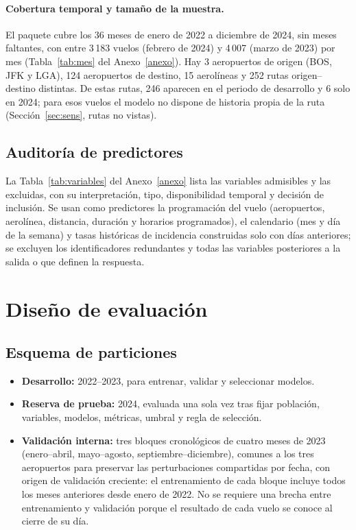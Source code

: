 \documentclass[11pt,a4paper]{article}
\begin{document}
\paragraph{Cobertura temporal y tamaño de la muestra.}
El paquete cubre los 36 meses de enero de 2022 a diciembre de 2024, sin meses faltantes, con entre 3\,183 vuelos (febrero de 2024) y 4\,007 (marzo de 2023) por mes (Tabla~\ref{tab:mes} del Anexo~\ref{anexo}). Hay 3 aeropuertos de origen (BOS, JFK y LGA), 124 aeropuertos de destino, 15 aerolíneas y 252 rutas origen--destino distintas. De estas rutas, 246 aparecen en el periodo de desarrollo y 6 solo en 2024; para esos vuelos el modelo no dispone de historia propia de la ruta (Sección~\ref{sec:sens}, rutas no vistas).
 
 
 
 
\subsection{Auditoría de predictores}
La Tabla~\ref{tab:variables} del Anexo~\ref{anexo} lista las variables admisibles y las excluidas, con su interpretación, tipo, disponibilidad temporal y decisión de inclusión. Se usan como predictores la programación del vuelo (aeropuertos, aerolínea, distancia, duración y horarios programados), el calendario (mes y día de la semana) y tasas históricas de incidencia construidas solo con días anteriores; se excluyen los identificadores redundantes y todas las variables posteriores a la salida o que definen la respuesta.
\FloatBarrier
 
\section{Diseño de evaluación}
 
\subsection{Esquema de particiones}
\begin{itemize}[leftmargin=*]
  \item \textbf{Desarrollo:} 2022--2023, para entrenar, validar y seleccionar modelos.
  \item \textbf{Reserva de prueba:} 2024, evaluada una sola vez tras fijar población, variables, modelos, métricas, umbral y regla de selección.
  \item \textbf{Validación interna:} tres bloques cronológicos de cuatro meses de 2023 (enero--abril, mayo--agosto, septiembre--diciembre), comunes a los tres aeropuertos para preservar las perturbaciones compartidas por fecha, con origen de validación creciente: el entrenamiento de cada bloque incluye todos los meses anteriores desde enero de 2022. No se requiere una brecha entre entrenamiento y validación porque el resultado de cada vuelo se conoce al cierre de su día.
\end{itemize}
 
\end{document}
